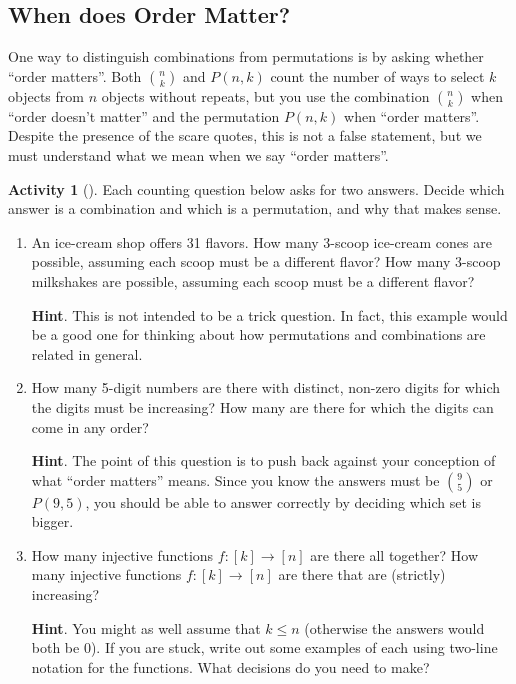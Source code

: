 \documentclass[10pt,]{book}
\theoremstyle{plain}
\theoremstyle{definition}
\theoremstyle{definition}
\theoremstyle{definition}
\newtheorem{activity}[project]{Activity}
\numberwithin{equation}{chapter}
\begin{document}
\subsection[{When does Order Matter?}]{When does Order Matter?}\label{subsec-ordermatters}
\hypertarget{p-790}{}%
One way to distinguish combinations from permutations is by asking whether ``order matters''.  Both \(\binom{n}{k}\) and \(P(n,k)\) count the number of ways to select \(k\) objects from \(n\) objects without repeats, but you use the combination \(\binom{n}{k}\) when ``order doesn't matter'' and the permutation \(P(n,k)\) when ``order matters''.  Despite the presence of the scare quotes, this is not a false statement, but we must understand what we mean when we say ``order matters''.%
\begin{activity}[]\label{activity-109}
\hypertarget{p-791}{}%
Each counting question below asks for two answers.  Decide which answer is a combination and which is a permutation, and why that makes sense.%
\begin{enumerate}[font=\bfseries,label=(\alph*),ref=\alph*]
\item\label{task-147} \hypertarget{p-792}{}%
An ice-cream shop offers 31 flavors.  How many 3-scoop ice-cream cones are possible, assuming each scoop must be a different flavor?  How many 3-scoop milkshakes are possible, assuming each scoop must be a different flavor?%
\par\smallskip%
\noindent\textbf{Hint}.\hypertarget{hint-73}{}\quad%
\hypertarget{p-793}{}%
This is not intended to be a trick question.  In fact, this example would be a good one for thinking about how permutations and combinations are related in general.%
\item\label{task-148} \hypertarget{p-794}{}%
How many 5-digit numbers are there with distinct, non-zero digits for which the digits must be increasing?  How many are there for which the digits can come in any order?%
\par\smallskip%
\noindent\textbf{Hint}.\hypertarget{hint-74}{}\quad%
\hypertarget{p-795}{}%
The point of this question is to push back against your conception of what ``order matters'' means.  Since you know the answers must be \(\binom{9}{5}\) or \(P(9,5)\), you should be able to answer correctly by deciding which set is bigger.%
\item\label{task-149} \hypertarget{p-796}{}%
How many injective functions \(f:[k] \to [n]\) are there all   together?  How many injective functions \(f:[k] \to [n]\) are there that are (strictly) increasing?%
\par\smallskip%
\noindent\textbf{Hint}.\hypertarget{hint-75}{}\quad%
\hypertarget{p-797}{}%
You might as well assume that \(k \le n\) (otherwise the answers would both be 0).  If you are stuck, write out some examples of each using two-line notation for the functions.  What decisions do you need to make?%
\end{enumerate}
\end{activity}
\end{document}
